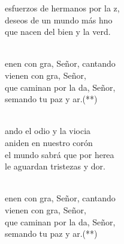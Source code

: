 \documentclass[12pt]{article}
\begin{document}
\begin{multicols*}{2}
\begin{cancion}
	esfuerzos de hermanos por la z,\\
	deseos de un mundo más hno\\
	que nacen del bien y la verd.\\\jump\\
	\begin{chorus}%
	enen con gra, Señor, cantando\\
	vienen con gra, Señor,\\
	 que caminan por la da, Señor,\\
	semando tu paz y ar.(**)\\
	\end{chorus}%
	\jump\\
	ando el odio y la viocia\\
	aniden en nuestro corón\\
	el mundo sabrá que por herea\\
	le aguardan tristezas y dor.\\\jump\\
	\begin{chorus}%
	enen con gra, Señor, cantando\\
	vienen con gra, Señor,\\
	 que caminan por la da, Señor,\\
	semando tu paz y ar.(**)\\
	\end{chorus}%
	\jump\\
\end{cancion}%


\end{multicols*}
\end{document}
